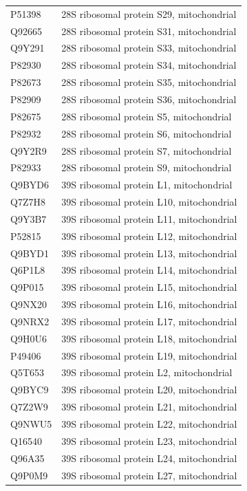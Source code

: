\documentclass[10pt,twoside]{article}
\begin{document}
\begin{longtable}{lL{0.75\textwidth}}
P51398	&	28S ribosomal protein S29, mitochondrial 	\\
Q92665	&	28S ribosomal protein S31, mitochondrial 	\\
Q9Y291	&	28S ribosomal protein S33, mitochondrial 	\\
P82930	&	28S ribosomal protein S34, mitochondrial 	\\
P82673	&	28S ribosomal protein S35, mitochondrial 	\\
P82909	&	28S ribosomal protein S36, mitochondrial 	\\
P82675	&	28S ribosomal protein S5, mitochondrial 	\\
P82932	&	28S ribosomal protein S6, mitochondrial 	\\
Q9Y2R9	&	28S ribosomal protein S7, mitochondrial 	\\
P82933	&	28S ribosomal protein S9, mitochondrial 	\\
Q9BYD6	&	39S ribosomal protein L1, mitochondrial 	\\
Q7Z7H8	&	39S ribosomal protein L10, mitochondrial 	\\
Q9Y3B7	&	39S ribosomal protein L11, mitochondrial 	\\
P52815	&	39S ribosomal protein L12, mitochondrial 	\\
Q9BYD1	&	39S ribosomal protein L13, mitochondrial 	\\
Q6P1L8	&	39S ribosomal protein L14, mitochondrial 	\\
Q9P015	&	39S ribosomal protein L15, mitochondrial 	\\
Q9NX20	&	39S ribosomal protein L16, mitochondrial 	\\
Q9NRX2	&	39S ribosomal protein L17, mitochondrial 	\\
Q9H0U6	&	39S ribosomal protein L18, mitochondrial 	\\
P49406	&	39S ribosomal protein L19, mitochondrial 	\\
Q5T653	&	39S ribosomal protein L2, mitochondrial 	\\
Q9BYC9	&	39S ribosomal protein L20, mitochondrial 	\\
Q7Z2W9	&	39S ribosomal protein L21, mitochondrial 	\\
Q9NWU5	&	39S ribosomal protein L22, mitochondrial 	\\
Q16540	&	39S ribosomal protein L23, mitochondrial 	\\
Q96A35	&	39S ribosomal protein L24, mitochondrial 	\\
Q9P0M9	&	39S ribosomal protein L27, mitochondrial 	\\

\end{longtable}
\end{document}
